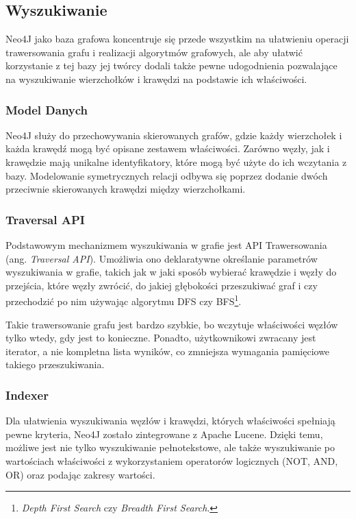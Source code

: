 \subsection*{Wyszukiwanie}

Neo4J jako baza grafowa koncentruje się przede wszystkim na ułatwieniu operacji trawersowania grafu i realizacji algorytmów grafowych, ale aby ułatwić korzystanie z tej bazy jej twórcy dodali także pewne udogodnienia pozwalające na wyszukiwanie wierzchołków i krawędzi na podstawie ich właściwości.

\subsubsection*{Model Danych}

Neo4J służy do przechowywania skierowanych grafów, gdzie każdy wierzchołek i każda krawędź mogą być opisane zestawem właściwości.
Zarówno węzły, jak i krawędzie mają unikalne identyfikatory, które mogą być użyte do ich wczytania z bazy.
Modelowanie symetrycznych relacji odbywa się poprzez dodanie dwóch przeciwnie skierowanych krawędzi między wierzchołkami.

\subsubsection*{Traversal API}

Podstawowym mechanizmem wyszukiwania w grafie jest API Trawersowania (ang. \emph{Traversal API}).
Umożliwia ono deklaratywne określanie parametrów wyszukiwania w grafie, takich jak w jaki sposób wybierać krawędzie i węzły do przejścia, które węzły zwrócić, do jakiej głębokości przeszukiwać graf i czy przechodzić po nim używając algorytmu DFS czy BFS\footnote{\emph{Depth First Search} czy \emph{Breadth First Search}.}.

Takie trawersowanie grafu jest bardzo szybkie, bo wczytuje właściwości węzłów tylko wtedy, gdy jest to konieczne.
Ponadto, użytkownikowi zwracany jest iterator, a nie kompletna lista wyników, co zmniejsza wymagania pamięciowe takiego przeszukiwania.

\subsubsection*{Indexer}

Dla ułatwienia wyszukiwania węzłów i krawędzi, których właściwości spełniają pewne kryteria, Neo4J zostało zintegrowane z Apache Lucene.
Dzięki temu, możliwe jest nie tylko wyszukiwanie pełnotekstowe, ale także wyszukiwanie po wartościach właściwości z wykorzystaniem operatorów logicznych (NOT, AND, OR) oraz podając zakresy wartości.

